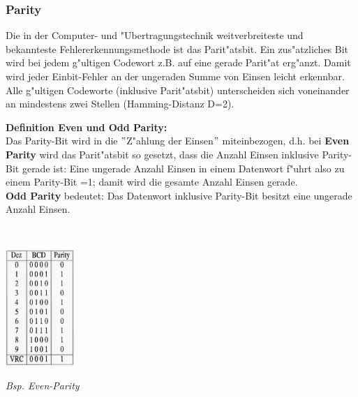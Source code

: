 \begin{minipage}{9cm}
	\subsubsection{Parity}
		Die in der Computer- und "Ubertragungstechnik weitverbreiteste und bekannteste Fehlererkennungsmethode ist das Parit"atsbit. Ein zus"atzliches Bit wird bei jedem g"ultigen Codewort z.B. auf eine gerade Parit"at erg"anzt. Damit wird jeder Einbit-Fehler an
			der ungeraden Summe von Einsen leicht erkennbar. Alle 
			g"ultigen Codeworte (inklusive Parit"atsbit) unterscheiden sich voneinander an mindestens zwei Stellen (Hamming-Distanz D=2).\\ 
			
	\begin{minipage}{6cm}
		\textbf{Definition Even und Odd Parity:}\\
		Das Parity-Bit wird in die $"$Z"ahlung der Einsen$"$ miteinbezogen, d.h. bei \textbf{Even Parity} wird das Parit"atsbit so gesetzt, dass die Anzahl Einsen inklusive Parity-Bit gerade ist: Eine ungerade Anzahl Einsen in einem Datenwort f"uhrt also zu einem Parity-Bit =1; damit
			wird die gesamte Anzahl Einsen gerade.\\
			 \textbf{Odd Parity} bedeutet: 
			Das Datenwort inklusive Parity-Bit besitzt eine ungerade 
			Anzahl Einsen.
	\end{minipage}
	\begin{minipage}{0.2cm}
		\ \
	\end{minipage}
	\begin{minipage}{2.6cm}
		\includegraphics[width=2.6cm]{pics/2-Parity}\\
		\begin{small}
			\textit{Bsp. Even-Parity}
		\end{small}
	\end{minipage}
\end{minipage}

